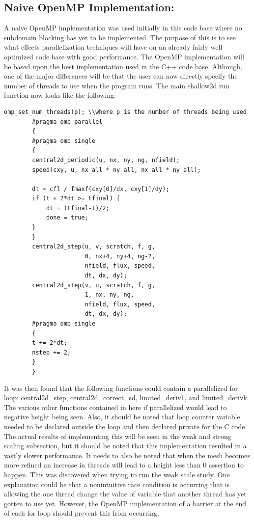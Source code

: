 \documentclass[12pt]{article}
\begin{document}
\subsection{Naive OpenMP Implementation:}

A naive OpenMP implementation was used initially in this code base where no subdomain blocking has yet to be implemented. The purpose of this is to see what effects parallelization techniques will have on an already fairly well optimized code base with good performance. The OpenMP implementation will be based upon the best implementation used in the C++ code base. Although, one of the major differences will be that the user can now directly specify the number of threads to use when the program runs. The main shallow2d run function now looks like the following:

\begin{verbatim}
omp_set_num_threads(p); \\where p is the number of threads being used
        #pragma omp parallel
        {
        #pragma omp single
        {
        central2d_periodic(u, nx, ny, ng, nfield);
        speed(cxy, u, nx_all * ny_all, nx_all * ny_all);

        dt = cfl / fmaxf(cxy[0]/dx, cxy[1]/dy);
        if (t + 2*dt >= tfinal) {
            dt = (tfinal-t)/2;
            done = true;
        }
        }
        central2d_step(u, v, scratch, f, g,
                       0, nx+4, ny+4, ng-2,
                       nfield, flux, speed,
                       dt, dx, dy);
        central2d_step(v, u, scratch, f, g,
                       1, nx, ny, ng,
                       nfield, flux, speed,
                       dt, dx, dy);
        #pragma omp single
        {
        t += 2*dt;
        nstep += 2;
        }
        }
\end{verbatim}

It was then found that the following functions could contain a parallelized for loop: central2d\_step, central2d\_correct\_sd, limited\_deriv1, and limited\_derivk. The various other functions contained in here if parallelized would lead to negative height being seen. Also, it should be noted that loop counter variable needed to be declared outside the loop and then declared private for the C code. The actual results of implementing this will be seen in the weak and strong scaling subsection, but it should be noted that this implementation resulted in a vastly slower performance. It needs to also be noted that when the mesh becomes more refined an increase in threads will lead to a height less than 0 assertion to happen. This was discovered when trying to run the weak scale study. One explanation could be that a nonintuitive race condition is occurring that is allowing the one thread change the value of variable that another thread has yet gotten to use yet. However, the OpenMP implementation of a barrier at the end of each for loop should prevent this from occurring.
\end{document}
